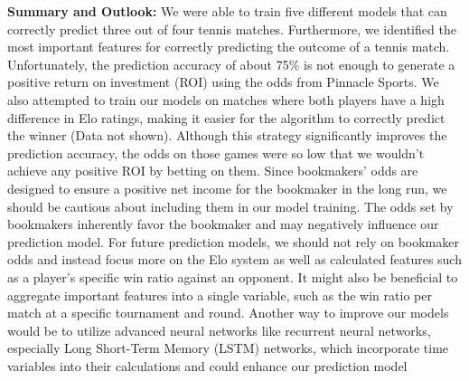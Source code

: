 \textbf{Summary and Outlook:}
We were able to train five different models that can correctly predict three out of four tennis matches. Furthermore, we identified the most important features for correctly predicting the outcome of a tennis match. Unfortunately, the prediction accuracy of about 75\% is not enough to generate a positive return on investment (ROI) using the odds from Pinnacle Sports. We also attempted to train our models on matches where both players have a high difference in Elo ratings, making it easier for the algorithm to correctly predict the winner (Data not shown). Although this strategy significantly improves the prediction accuracy, the odds on those games were so low that we wouldn’t achieve any positive ROI by betting on them. Since bookmakers' odds are designed to ensure a positive net income for the bookmaker in the long run, we should be cautious about including them in our model training. The odds set by bookmakers inherently favor the bookmaker and may negatively influence our prediction model. For future prediction models, we should not rely on bookmaker odds and instead focus more on the Elo system as well as calculated features such as a player's specific win ratio against an opponent. It might also be beneficial to aggregate important features into a single variable, such as the win ratio per match at a specific tournament and round. Another way to improve our models would be to utilize advanced neural networks like recurrent neural networks, especially Long Short-Term Memory (LSTM) networks, which incorporate time variables into their calculations and could enhance our prediction model
